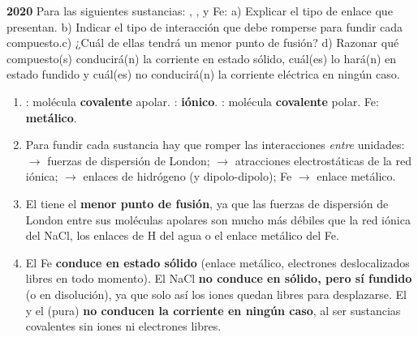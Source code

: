\begin{exerciseEVAU}
    \textbf{2020} Para las siguientes sustancias: , ,  y Fe: a) Explicar el tipo de enlace que presentan. b) Indicar el tipo de interacción que debe romperse para fundir cada compuesto.c) ¿Cuál de ellas tendrá un menor punto de fusión? d) Razonar qué compuesto(s) conducirá(n) la corriente en estado sólido, cuál(es) lo hará(n) en estado fundido y cuál(es) no conducirá(n) la corriente eléctrica en ningún caso.


    \begin{solu}


        \begin{enumerate}[label=\letraminuscula]
            \item {}: molécula \textbf{covalente} apolar. : \textbf{iónico}. : molécula \textbf{covalente} polar. Fe: \textbf{metálico}.

            \item Para fundir cada sustancia hay que romper las interacciones \emph{entre} unidades:  $\to$ fuerzas de dispersión de London;  $\to$ atracciones electrostáticas de la red iónica;  $\to$ enlaces de hidrógeno (y dipolo-dipolo); Fe $\to$ enlace metálico.

            \item El  tiene el \textbf{menor punto de fusión}, ya que las fuerzas de dispersión de London entre sus moléculas apolares son mucho más débiles que la red iónica del NaCl, los enlaces de H del agua o el enlace metálico del Fe.

            \item El Fe \textbf{conduce en estado sólido} (enlace metálico, electrones deslocalizados libres en todo momento). El NaCl \textbf{no conduce en sólido, pero sí fundido} (o en disolución), ya que solo así los iones quedan libres para desplazarse. El  y el  (pura) \textbf{no conducen la corriente en ningún caso}, al ser sustancias covalentes sin iones ni electrones libres.
        \end{enumerate}
    \end{solu}
\end{exerciseEVAU}

